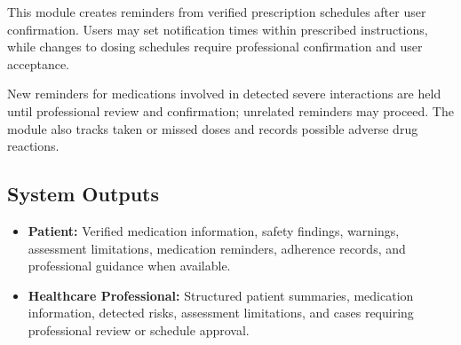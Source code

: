 This module creates reminders from verified prescription schedules after user confirmation. Users may set notification times within prescribed instructions, while changes to dosing schedules require professional confirmation and user acceptance.

New reminders for medications involved in detected severe interactions are held until professional review and confirmation; unrelated reminders may proceed. The module also tracks taken or missed doses and records possible adverse drug reactions.

\subsection{System Outputs}

\begin{itemize}
    \item \textbf{Patient:} Verified medication information, safety findings, warnings, assessment limitations, medication reminders, adherence records, and professional guidance when available.

    \item \textbf{Healthcare Professional:} Structured patient summaries, medication information, detected risks, assessment limitations, and cases requiring professional review or schedule approval.
\end{itemize}
